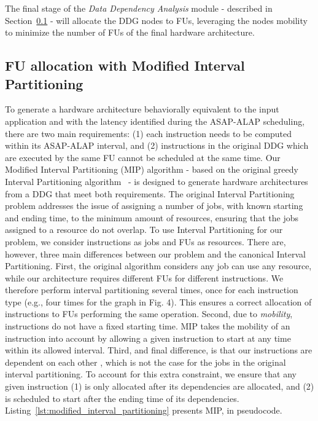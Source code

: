 The final stage of the \textit{Data Dependency Analysis} module - described in Section~\ref{ssec:modified_interval_partitioning} - will allocate the DDG nodes to FUs, leveraging the nodes mobility to minimize the number of FUs of the final hardware architecture.

\vspace{-2mm}
\subsection{FU allocation with Modified Interval Partitioning}
\label{ssec:modified_interval_partitioning}
\vspace{-1mm}
To generate a hardware architecture behaviorally equivalent to the input application and with the latency identified during the ASAP-ALAP scheduling, there are two main requirements: (1) each instruction needs to be computed within its ASAP-ALAP interval, and (2) instructions in the original DDG which are executed by the same FU cannot be scheduled at the same time.
Our Modified Interval Partitioning (MIP) algorithm - based on the original greedy Interval Partitioning algorithm~\cite{greedyIntervalPartitioning} - is designed to generate hardware architectures from a DDG that meet both requirements. The original Interval Partitioning problem addresses the issue of assigning a number of jobs, with known starting and ending time, to the minimum amount of resources, ensuring that the jobs assigned to a resource do not overlap. To use Interval Partitioning for our problem, we consider instructions as jobs and FUs as resources. There are, however, three main differences between our problem and the canonical Interval Partitioning.
First, the original algorithm considers any job can use any resource, while our architecture requires different FUs for different instructions. We therefore perform interval partitioning several times, once for each instruction type (e.g., four times for the graph in Fig. 4). This ensures a correct allocation of instructions to FUs performing the same operation. Second, due to \textit{mobility}, instructions do not have a fixed starting time. MIP takes the mobility of an instruction into account by allowing a given instruction to start at any time within its allowed interval. Third, and final difference, is that our instructions are dependent on each other , which is not the case for the jobs in the original interval partitioning. To account for this extra constraint, we ensure that any given instruction (1) is only allocated after its dependencies are allocated, and (2) is scheduled to start after the ending time of its dependencies.
Listing~\ref{lst:modified_interval_partitioning} presents MIP, in pseudocode. %

